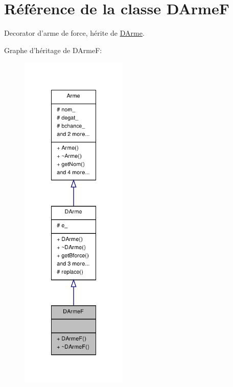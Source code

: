 \hypertarget{class_d_arme_f}{\section{Référence de la classe D\-Arme\-F}
\label{class_d_arme_f}
}


Decorator d'arme de force, hérite de \hyperlink{class_d_arme}{D\-Arme}.  




Graphe d'héritage de D\-Arme\-F\-:
\nopagebreak
\begin{figure}[H]
\begin{center}
\leavevmode
\includegraphics[width=144pt]{class_d_arme_f__inherit__graph}
\end{center}
\end{figure}


